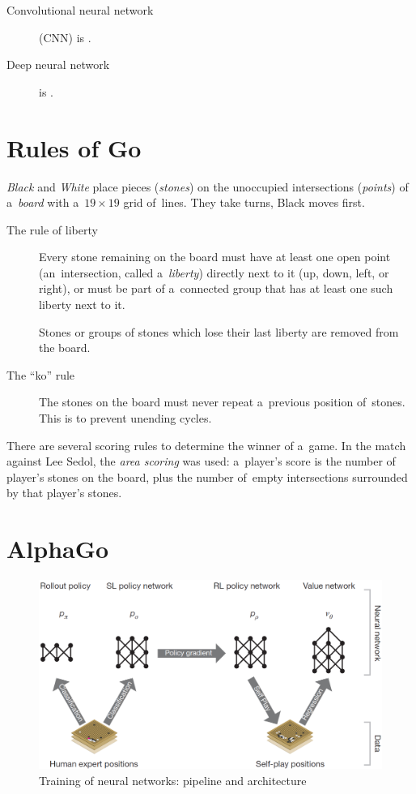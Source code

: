 \documentclass[a4paper,10pt]{article}
\begin{document}
\begin{description}
  \item [Convolutional neural network] (CNN) is \todo.
  \item [Deep neural network] is \todo.
\end{description}

\section{Rules of Go}
\emph{Black} and \emph{White} place pieces (\emph{stones}) on the unoccupied intersections (\emph{points}) of a~\emph{board} with a~$19\times19$ grid of~lines.
They take turns, Black moves first.
\begin{description}
  \item [The rule of liberty]
    Every stone remaining on the board must have at least one open point (an~intersection, called a~\emph{liberty}) directly next to it (up, down, left, or right), or must be part of a~connected group that has at least one such liberty next to it.

    Stones or groups of stones which lose their last liberty are removed from the board.

  \item [The ``ko'' rule]
    The stones on the board must never repeat a~previous position of~stones.
    This is to prevent unending cycles.
\end{description}

There are several scoring rules to determine the winner of a~game.
In the match against Lee Sedol, the \emph{area scoring} was used:
a~player's score is the number of player's stones on the board, plus the number of~empty intersections surrounded by that player's stones.

\section{AlphaGo}
\begin{figure}[H]
  \centering
  \includegraphics[width=.7\textwidth]{../img/neural_nets_pipeline.png}
  \caption{Training of neural networks: pipeline and architecture}
  \label{fig:neural_nets_pipeline}
\end{figure}
\end{document}
